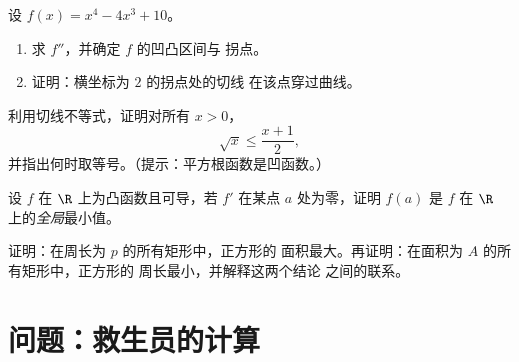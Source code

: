 \begin{exercise}[$\star\star$]\label{exo:g12:deriv:6}
设 $f(x) = x^4 - 4x^3 + 10$。
\begin{enumerate}
  \item 求 $f''$，并确定 $f$ 的凹凸区间与
        拐点。
  \item 证明：横坐标为 $2$ 的拐点处的切线
        在该点穿过曲线。
\end{enumerate}
\end{exercise}

\begin{exercise}[$\star\star$]\label{exo:g12:deriv:7}
利用切线不等式，证明对所有 $x > 0$，
\[
\sqrt{x} \leq \frac{x + 1}{2},
\]
并指出何时取等号。（提示：平方根函数是凹函数。）
\end{exercise}

\begin{exercise}[$\star\star\star$]\label{exo:g12:deriv:8}
设 $f$ 在 $\R$ 上为凸函数且可导，若 $f'$
在某点 $a$ 处为零，证明 $f(a)$ 是 $f$ 在
$\R$ 上的\emph{全局}最小值。
\end{exercise}

\begin{exercise}[$\star\star\star$]\label{exo:g12:deriv:9}
证明：在周长为 $p$ 的所有矩形中，正方形的
面积最大。再证明：在面积为 $A$ 的所有矩形中，正方形的
周长最小，并解释这两个结论
之间的联系。
\end{exercise}

\section{问题：救生员的计算}

